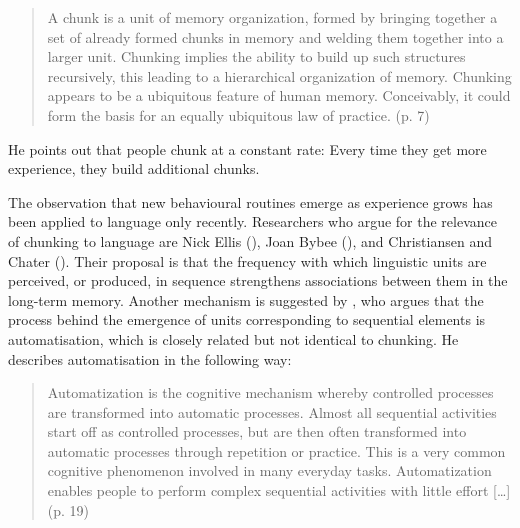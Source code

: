 \begin{quote}
A chunk is a unit of memory organization, formed by bringing together a set of already formed chunks in memory and welding them together into a larger unit. Chunking implies the ability to build up such structures recursively, this leading to a hierarchical organization of memory. Chunking appears to be a ubiquitous feature of human memory. Conceivably, it could form the basis for an equally ubiquitous law of practice. (p. 7)
\end{quote}
He points out that people chunk at a constant rate: Every time they get more experience, they build additional chunks. 

The observation that new behavioural routines emerge as experience grows has been applied to language only recently. Researchers who argue for the relevance of chunking to language are Nick Ellis (\citeyear{ellis-1996}), Joan Bybee (\citeyear{bybee-constituency-2002}), and Christiansen and Chater (\citeyear{christiansen-chater-2016}). Their proposal is that the frequency with which linguistic units are perceived, or produced, in sequence strengthens associations between them in the long-term memory. Another mechanism is suggested by \citet{diessel-toappear}, who argues that the process behind the emergence of units corresponding to sequential elements is automatisation, which is closely related but not identical to chunking. He describes automatisation in the following way: 

\begin{quote}
Automatization is the cognitive mechanism whereby controlled processes are transformed into automatic processes. Almost all sequential activities start off as controlled processes, but are then often transformed into automatic processes through repetition or practice. This is a very common cognitive phenomenon involved in many everyday tasks. Automatization enables people to perform complex sequential activities with little effort [\dots] (p. 19)
\end{quote}

